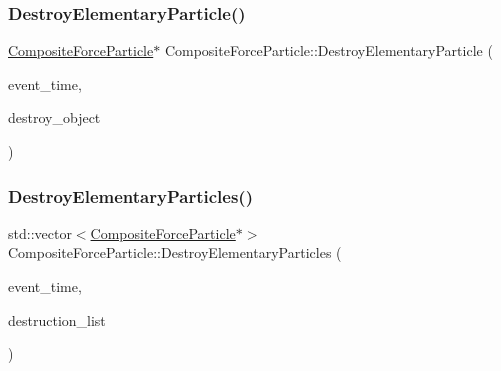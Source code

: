\mbox{\label{classCompositeForceParticle_ac176d2e41d75e308d4b510f3338d8b9e}} 
\subsubsection{\texorpdfstring{Destroy\+Elementary\+Particle()}{DestroyElementaryParticle()}}
{\footnotesize\ttfamily \mbox{\hyperlink{classCompositeForceParticle}{Composite\+Force\+Particle}}$\ast$ Composite\+Force\+Particle\+::\+Destroy\+Elementary\+Particle (\begin{DoxyParamCaption}\item[{std\+::chrono\+::time\+\_\+point$<$ \mbox{\hyperlink{universe_8h_a0ef8d951d1ca5ab3cfaf7ab4c7a6fd80}{Clock}} $>$}]{event\+\_\+time,  }\item[{\mbox{\hyperlink{classCompositeForceParticle}{Composite\+Force\+Particle}} $\ast$}]{destroy\+\_\+object }\end{DoxyParamCaption})}

\mbox{\label{classCompositeForceParticle_a602ef5e477db576e47c36436b83f80f5}} 
\subsubsection{\texorpdfstring{Destroy\+Elementary\+Particles()}{DestroyElementaryParticles()}}
{\footnotesize\ttfamily std\+::vector$<$\mbox{\hyperlink{classCompositeForceParticle}{Composite\+Force\+Particle}}$\ast$$>$ Composite\+Force\+Particle\+::\+Destroy\+Elementary\+Particles (\begin{DoxyParamCaption}\item[{std\+::chrono\+::time\+\_\+point$<$ \mbox{\hyperlink{universe_8h_a0ef8d951d1ca5ab3cfaf7ab4c7a6fd80}{Clock}} $>$}]{event\+\_\+time,  }\item[{std\+::vector$<$ \mbox{\hyperlink{classCompositeForceParticle}{Composite\+Force\+Particle}} $\ast$$>$}]{destruction\+\_\+list }\end{DoxyParamCaption})}

